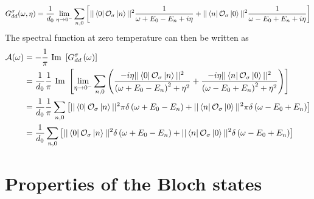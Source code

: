 \documentclass[reprint,hidelinks]{revtex4-2}
\begin{document}
\begin{widetext}
\begin{equation}\begin{aligned}
	G_{d d}^\sigma(\omega, \eta) = \frac{1}{d_0}\lim_{\eta \to 0^-}\sum_{n,0}\left[||\bra{0}\mathcal{O}_{\sigma}\ket{n}||^2\frac{1}{\omega + E_0 - E_n + i\eta} + ||\bra{n}\mathcal{O}_{\sigma}\ket{0}||^2\frac{1}{\omega - E_0 + E_n + i\eta}\right]\\
\end{aligned}\end{equation}
The spectral function at zero temperature can then be written as
\begin{equation}\begin{aligned}
	\mathcal{A(\omega)} &= -\frac{1}{\pi}\text{ Im }\left[G_{dd}^\sigma\left( \omega \right) \right] \\
			    &= \frac{1}{d_0}\frac{1}{\pi}\text{ Im }\left[\lim_{\eta \to 0^-}\sum_{n,0}\left(\frac{-i\eta ||\bra{0}\mathcal{O}_{\sigma}\ket{n}||^2}{\left(\omega + E_0 - E_n\right)^2 + \eta^2} + \frac{-i\eta ||\bra{n}\mathcal{O}_{\sigma}\ket{0}||^2}{\left(\omega - E_0 + E_n\right)^2 + \eta^2}\right)\right]\\
			    &= \frac{1}{d_0}\frac{1}{\pi}\sum_{n,0}\left[||\bra{0}\mathcal{O}_{\sigma}\ket{n}||^2\pi\delta\left(\omega + E_0 - E_n\right) + ||\bra{n}\mathcal{O}_{\sigma}\ket{0}||^2\pi\delta\left(\omega - E_0 + E_n\right)\right]\\
			    &= \frac{1}{d_0}\sum_{n,0}\left[||\bra{0}\mathcal{O}_{\sigma}\ket{n}||^2\delta\left(\omega + E_0 - E_n\right) + ||\bra{n}\mathcal{O}_{\sigma}\ket{0}||^2\delta\left(\omega - E_0 + E_n\right)\right]\\
\end{aligned}\end{equation}

\section{Properties of the Bloch states}


\end{widetext}
\end{document}
